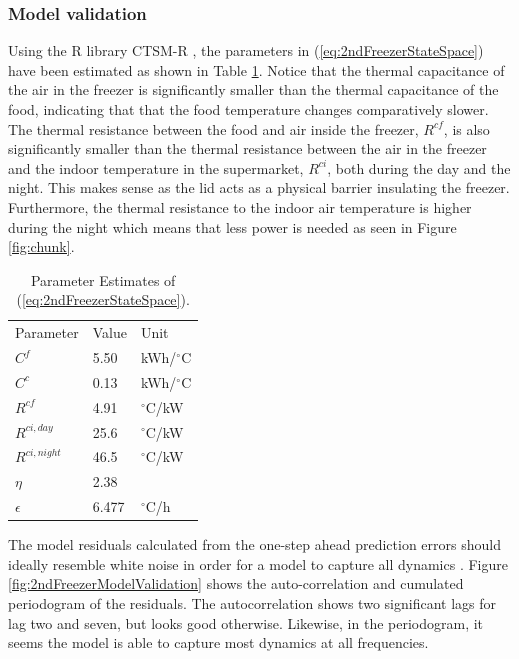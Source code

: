 \subsubsection{Model validation}

Using the R library CTSM-R \cite{juhl2016ctsmr}, the parameters in (\ref{eq:2ndFreezerStateSpace}) have been estimated as shown in Table \ref{tab:parameter_estimates}. Notice that the thermal capacitance of the air in the freezer is significantly smaller than the thermal capacitance of the food, indicating that that the food temperature changes comparatively slower. The thermal resistance between the food and air inside the freezer, $R^{cf}$, is also significantly smaller than the thermal resistance between the air in the freezer and the indoor temperature in the supermarket, $R^{ci}$, both during the day and the night. This makes sense as the lid acts as a physical barrier insulating the freezer. Furthermore, the thermal resistance to the indoor air temperature is higher during the night which means that less power is needed as seen in Figure \ref{fig:chunk}.

\begin{table}[!t]
    \caption{Parameter Estimates of (\ref{eq:2ndFreezerStateSpace}).}
    \label{tab:parameter_estimates}
    \centering
    \begin{tabular}[b]{|l|l|l|}
        \hline
        Parameter       & Value & Unit            \\ \hhline{|=|=|=|}
        $C^f$           & 5.50  & kWh/$^{\circ}$C \\
        $C^c$           & 0.13  & kWh/$^{\circ}$C \\
        $R^{cf}$        & 4.91  & $^{\circ}$C/kW  \\
        $R^{ci, day}$   & 25.6  & $^{\circ}$C/kW  \\
        $R^{ci, night}$ & 46.5  & $^{\circ}$C/kW  \\
        $\eta$          & 2.38  &                 \\
        $\epsilon$      & 6.477 & $^{\circ}$C/h   \\ \hline
    \end{tabular}
\end{table}


The model residuals calculated from the one-step ahead prediction errors should ideally resemble white noise in order for a model to capture all dynamics \cite{madsen2007time}. Figure \ref{fig:2ndFreezerModelValidation} shows the auto-correlation and cumulated periodogram of the residuals. The autocorrelation shows two significant lags for lag two and seven, but looks good otherwise. Likewise, in the periodogram, it seems the model is able to capture most dynamics at all frequencies.

